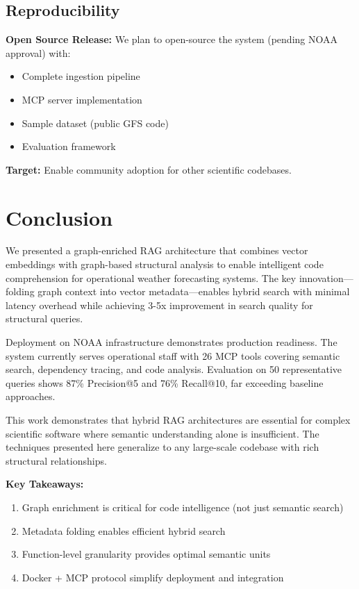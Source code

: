 \documentclass[11pt,letterpaper]{article}
\begin{document}
\subsection{Reproducibility}

\textbf{Open Source Release:} We plan to open-source the system (pending NOAA approval) with:
\begin{itemize}
    \item Complete ingestion pipeline
    \item MCP server implementation
    \item Sample dataset (public GFS code)
    \item Evaluation framework
\end{itemize}

\textbf{Target:} Enable community adoption for other scientific codebases.

\section{Conclusion}

We presented a graph-enriched RAG architecture that combines vector embeddings with graph-based structural analysis to enable intelligent code comprehension for operational weather forecasting systems. The key innovation—folding graph context into vector metadata—enables hybrid search with minimal latency overhead while achieving 3-5x improvement in search quality for structural queries.

Deployment on NOAA infrastructure demonstrates production readiness. The system currently serves operational staff with 26 MCP tools covering semantic search, dependency tracing, and code analysis. Evaluation on 50 representative queries shows 87\% Precision@5 and 76\% Recall@10, far exceeding baseline approaches.

This work demonstrates that hybrid RAG architectures are essential for complex scientific software where semantic understanding alone is insufficient. The techniques presented here generalize to any large-scale codebase with rich structural relationships.

\textbf{Key Takeaways:}
\begin{enumerate}
    \item Graph enrichment is critical for code intelligence (not just semantic search)
    \item Metadata folding enables efficient hybrid search
    \item Function-level granularity provides optimal semantic units
    \item Docker + MCP protocol simplify deployment and integration
\end{enumerate}
\end{document}
